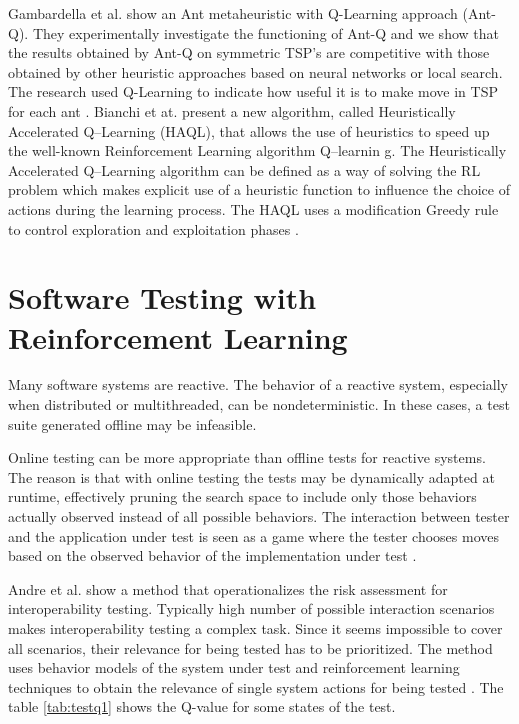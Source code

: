 Gambardella et al. show an Ant metaheuristic with Q-Learning approach (Ant-Q). They experimentally investigate the functioning of Ant-Q and we show that the results obtained by Ant-Q on symmetric TSP's are competitive with those obtained by other heuristic approaches based on neural networks or
local search. The research used Q-Learning to indicate how useful it is to make move in TSP for each ant \cite{Gambardella1995}.  Bianchi et at.  present a new algorithm, called Heuristically Accelerated Q–Learning (HAQL), that allows the use of heuristics to speed up the well-known Reinforcement Learning algorithm Q–learnin    g. The Heuristically Accelerated Q–Learning algorithm can be defined as a way of solving the RL problem which makes explicit use of a heuristic function to influence the choice of actions during the learning process. The HAQL uses a modification Greedy rule to control exploration and exploitation phases \cite{Matsuura2015}. 

\section{Software Testing with Reinforcement Learning}

Many software systems are reactive. The behavior of a reactive system, especially when distributed or multithreaded, can be nondeterministic. In these cases, a test suite generated offline may be infeasible.

Online testing can be more appropriate than offline
tests for reactive systems. The reason is that with online testing the tests may be dynamically adapted at runtime, effectively pruning the search space to include only those behaviors actually observed instead of all possible behaviors. The interaction between
tester and the application under test is seen as a game  where the tester chooses moves based on the observed behavior of the implementation under test \cite{Havelund2006}.

Andre et al. show a method that operationalizes the risk assessment for interoperability testing. Typically high number of possible interaction scenarios makes interoperability testing a complex task. Since it seems impossible to cover all scenarios, their relevance for being tested has to be prioritized. The method uses behavior models of the system under test and reinforcement learning techniques to obtain the relevance of single system actions for being tested \cite{Piel2010}. The table \ref{tab:testq1} shows the Q-value for some states of the test. 


